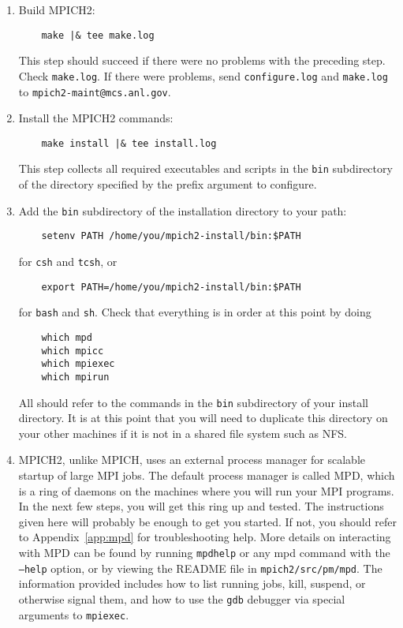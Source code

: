 \documentclass[dvipdfm,11pt]{article}
\begin{document}
\begin{enumerate}
\item
Build MPICH2:
\begin{verbatim}
    make |& tee make.log
\end{verbatim}
This step should succeed if there were no problems with the preceding
step.  Check \texttt{make.log}.  If there were problems, send
\texttt{configure.log} and \texttt{make.log} to
\texttt{mpich2-maint@mcs.anl.gov}.

\item
Install the MPICH2 commands:
\begin{verbatim}
    make install |& tee install.log
\end{verbatim}
This step collects all required executables and scripts in the \texttt{bin}
subdirectory of the directory specified by the prefix argument to
configure. 

\item
Add the \texttt{bin} subdirectory of the installation directory to your path:
\begin{verbatim}
    setenv PATH /home/you/mpich2-install/bin:$PATH
\end{verbatim}
for \texttt{csh} and \texttt{tcsh}, or 
\begin{verbatim}
    export PATH=/home/you/mpich2-install/bin:$PATH
\end{verbatim}
for \texttt{bash} and \texttt{sh}.  Check that everything is in order at
this point by doing
\begin{verbatim}
    which mpd
    which mpicc
    which mpiexec
    which mpirun
\end{verbatim}
All should refer to the commands in the \texttt{bin} subdirectory of your
install directory.  It is at this point that you will need to
duplicate this directory on your other machines if it is not
in a shared file system such as NFS.

\item
MPICH2, unlike MPICH, uses an external process manager for scalable
startup of large MPI jobs.  The default process manager is called
MPD, which is a ring of daemons on the machines where you will run
your MPI programs.  In the next few steps, you will get this ring up
and tested.
The instructions given here will probably be enough to get you started.
If not, you should refer to Appendix~\ref{app:mpd} for troubleshooting help.
More details on interacting with MPD can be found by running
\texttt{mpdhelp} or any mpd command with the \texttt{--help} option, or by
viewing the README file in \texttt{mpich2/src/pm/mpd}.  The information
provided includes how to list running jobs, kill, suspend, or otherwise
signal them, and how to use the \texttt{gdb} debugger via special
arguments to \texttt{mpiexec}.


\end{enumerate}
\end{document}
